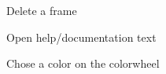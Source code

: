 \documentclass[11pt]{article} %
\begin{document}
\begin{figure}[H]
	\centering
	\caption{Delete a frame}
	\label{fig:UC10}
\end{figure}

\begin{figure}[H]
	\centering
	\caption{Open help/documentation text}
	\label{fig:UC11}
\end{figure}

\begin{figure}[H]
	\centering
	\caption{Chose a color on the colorwheel}
	\label{fig:UC12}
\end{figure}
\end{document}
